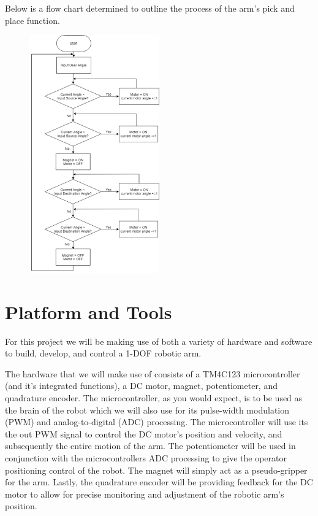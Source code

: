 \documentclass[12pt]{article}
\begin{document}
Below is a flow chart determined to outline the process of the arm’s pick and place function.
\begin{figure}[H]
    \centering
    \includegraphics[width=0.5\textwidth]{450_design_report.png}
\end{figure}
\section{Platform and Tools}
For this project we will be making use of both a variety of hardware and software to build, develop, and control a 1-DOF robotic arm.

The hardware that we will make use of consists of a TM4C123 microcontroller (and it’s integrated functions), a DC motor, magnet, potentiometer, and quadrature encoder. The microcontroller, as you would expect, is to be used as the brain of the robot which we will also use for its pulse-width modulation (PWM) and analog-to-digital (ADC) processing. The microcontroller will use its the out PWM signal to control the DC motor’s position and velocity, and subsequently the entire motion of the arm. The potentiometer will be used in conjunction with the microcontrollers ADC processing to give the operator positioning control of the robot. The magnet will simply act as a pseudo-gripper for the arm. Lastly, the quadrature encoder will be providing feedback for the DC motor to allow for precise monitoring and adjustment of the robotic arm’s position.
\end{document}
